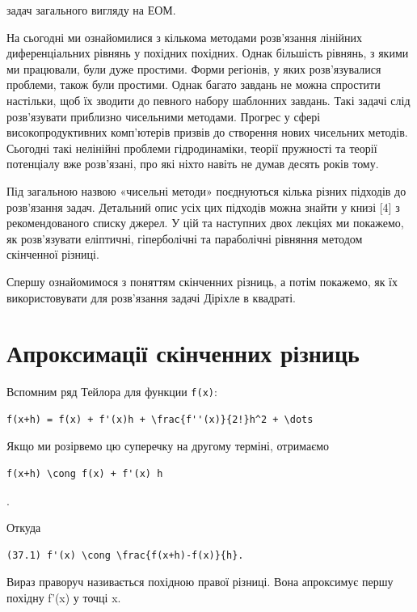 \documentclass[
  ukrainian,
]{article}
\begin{document}
задач загального вигляду на ЕОМ.

На сьогодні ми ознайомилися з кількома методами розв'язання лінійних
диференціальних рівнянь у похідних похідних. Однак більшість рівнянь, з
якими ми працювали, були дуже простими. Форми регіонів, у яких
розв'язувалися проблеми, також були простими. Однак багато завдань не
можна спростити настільки, щоб їх зводити до певного набору шаблонних
завдань. Такі задачі слід розв'язувати приблизно чисельними методами.
Прогрес у сфері високопродуктивних комп'ютерів призвів до створення
нових чисельних методів. Сьогодні такі нелінійні проблеми гідродинаміки,
теорії пружності та теорії потенціалу вже розв'язані, про які ніхто
навіть не думав десять років тому.

Під загальною назвою «чисельні методи» поєднуються кілька різних
підходів до розв'язання задач. Детальний опис усіх цих підходів можна
знайти у книзі {[}4{]} з рекомендованого списку джерел. У цій та
наступних двох лекціях ми покажемо, як розв'язувати еліптичні,
гіперболічні та параболічні рівняння методом скінченної різниці.

Спершу ознайомимося з поняттям скінченних різниць, а потім покажемо, як
їх використовувати для розв'язання задачі Діріхле в квадраті.

\section{Апроксимації скінченних
різниць}\label{ux430ux43fux440ux43eux43aux441ux438ux43cux430ux446ux456ux457-ux441ux43aux456ux43dux447ux435ux43dux43dux438ux445-ux440ux456ux437ux43dux438ux446ux44c}

Вспомним ряд Тейлора для функции \texttt{f(x)}:

\begin{verbatim}
f(x+h) = f(x) + f'(x)h + \frac{f''(x)}{2!}h^2 + \dots
\end{verbatim}

Якщо ми розірвемо цю суперечку на другому терміні, отримаємо

\begin{verbatim}
f(x+h) \cong f(x) + f'(x) h
\end{verbatim}

.

Откуда

\begin{verbatim}
(37.1) f'(x) \cong \frac{f(x+h)-f(x)}{h}.
\end{verbatim}

Вираз праворуч називається похідною правої різниці. Вона апроксимує
першу похідну f'(x) у точці x.
\end{document}
